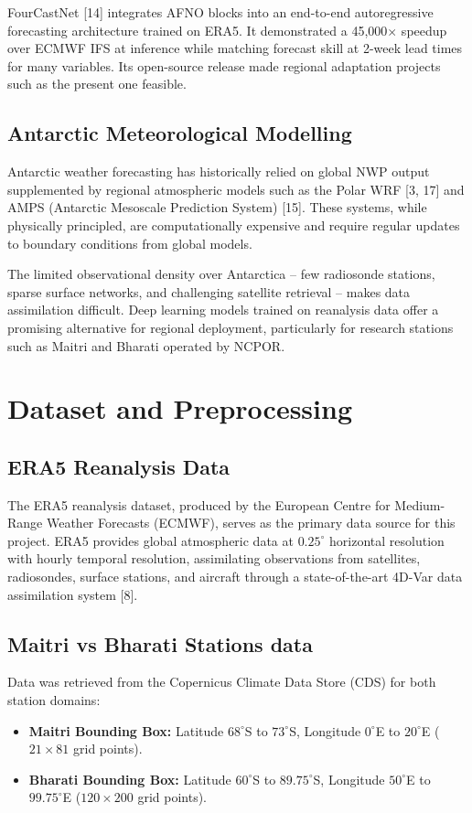 \documentclass[12pt,titlepage,a4paper]{report}
\begin{document}
FourCastNet [14] integrates AFNO blocks into an end-to-end autoregressive forecasting architecture trained on ERA5. It demonstrated a 45,000$\times$ speedup over ECMWF IFS at inference while matching forecast skill at 2-week lead times for many variables. Its open-source release made regional adaptation projects such as the present one feasible.

\section{Antarctic Meteorological Modelling}
Antarctic weather forecasting has historically relied on global NWP output supplemented by regional atmospheric models such as the Polar WRF [3, 17] and AMPS (Antarctic Mesoscale Prediction System) [15]. These systems, while physically principled, are computationally expensive and require regular updates to boundary conditions from global models.

The limited observational density over Antarctica -- few radiosonde stations, sparse surface networks, and challenging satellite retrieval -- makes data assimilation difficult. Deep learning models trained on reanalysis data offer a promising alternative for regional deployment, particularly for research stations such as Maitri and Bharati operated by NCPOR.

\chapter{Dataset and Preprocessing}
\section{ERA5 Reanalysis Data}
The ERA5 reanalysis dataset, produced by the European Centre for Medium-Range Weather Forecasts (ECMWF), serves as the primary data source for this project. ERA5 provides global atmospheric data at $0.25^\circ$ horizontal resolution with hourly temporal resolution, assimilating observations from satellites, radiosondes, surface stations, and aircraft through a state-of-the-art 4D-Var data assimilation system [8].

\section{Maitri vs Bharati Stations data}
Data was retrieved from the Copernicus Climate Data Store (CDS) for both station domains:
\begin{itemize}
    \item \textbf{Maitri Bounding Box:} Latitude $68^\circ$S to $73^\circ$S, Longitude $0^\circ$E to $20^\circ$E ($21 \times 81$ grid points).
    \item \textbf{Bharati Bounding Box:} Latitude $60^\circ$S to $89.75^\circ$S, Longitude $50^\circ$E to $99.75^\circ$E ($120 \times 200$ grid points).
\end{itemize}
\end{document}
